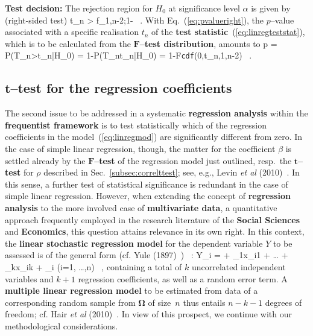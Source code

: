 \medskip
\noindent
\textbf{Test decision:} The rejection region for $H_{0}$ at 
significance level $\alpha$ is given by (right-sided test)
%
\be
t_{n} > f_{1,n-2;1-\alpha} \ .
\ee
%
With Eq.~(\ref{eq:pvalueright}), the $p$--value associated with a 
specific realisation $t_{n}$ of the
\textbf{test statistic}~(\ref{eq:linregteststat}), which is
to be calculated from the $\boldsymbol{F}$\textbf{--test
distribution}, amounts 
to
%
\be
p = P(T_{n}>t_{n}|H_{0}) = 1-P(T_{n}\leq t_{n}|H_{0})
= 1-F\texttt{cdf}(0,t_{n},1,n-2) \ .
\ee
%

\subsection[$t$--test for the regression 
coefficients]{$\boldsymbol{t}$--test for the regression 
coefficients}
The second issue to be addressed in a systematic \textbf{regression 
analysis} within the \textbf{frequentist framework} is to test
statistically which of the regression coefficients in the
model~(\ref{eq:linregmod}) are significantly different from zero.
In the case of simple linear regression, though, the matter for the coefficient $\beta$ is settled already 
by the \textbf{$\boldsymbol{F}$--test} of the regression model just 
outlined, resp.~the \textbf{$\boldsymbol{t}$--test} for $\rho$ 
described in Sec.~\ref{subsec:correlttest}; see, e.g., Levin 
\textit{et al} (2010)~. In this sense, a 
further test of statistical significance is redundant in the case 
of simple linear regression. However, when extending the concept 
of \textbf{regression analysis} to the more involved case of
\textbf{multivariate data}, a quantitative approach frequently
employed in the research literature of the \textbf{Social Sciences}
and \textbf{Economics}, this question attains relevance in its own
right. In this context, the \textbf{linear stochastic regression
model} for the dependent variable $Y$ to be assessed is of the
general form (cf. Yule (1897)~)
%
\be
{}
\ \boldsymbol{\Omega}: \quad
Y_{i} = \alpha + \beta_{1}x_{i1} + \ldots
+ \beta_{k}x_{ik} + \varepsilon_{i}
\qquad (i=1, \ldots,n) \ ,
\ee
%
containing a total of $k$ uncorrelated independent variables and 
$k+1$ regression coefficients, as well as a random error term. A 
\textbf{multiple linear regression model} to be estimated from data 
of a corresponding random sample from $\boldsymbol{\Omega}$ of 
size~$n$ thus entails $n-k-1$ degrees of freedom; cf. 
Hair \textit{et al} (2010)~. In view of this 
prospect, we continue with our methodological considerations.

